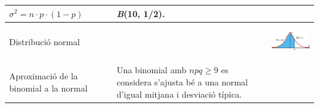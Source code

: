 \begin{longtable}[]{|p{4cm}|p{5cm}|p{5cm}|}
		$\sigma^2 = n \cdot p \cdot (1-p)$ \strut
	  &  
		\emph{B}(10, 1/2). 
		\\[0.25cm] \hline
		 \cellcolor{lightgray}
	Distribució normal & &
	\vspace{0.5cm}
	\begin{center}
	\includegraphics[width=5cm]{img-12/normal01}
	\end{center}
	\\ [0.25cm]\hline
	 \cellcolor{lightgray}
	Aproximació de la binomial a la normal & Una binomial amb $npq \geq 9$
	es considera s'ajusta bé a una normal d'igual mitjana i desviació
	típica. & \\ [0.25cm]\hline
	\bottomrule
\end{longtable}
